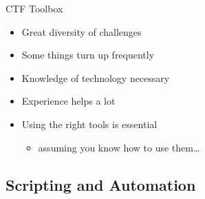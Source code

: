\begin{frame}
  {CTF Toolbox}

  \begin{itemize}
    \item Great diversity of challenges
    \item Some things turn up frequently
    \item Knowledge of technology necessary
    \item Experience helps a lot
  \end{itemize}

  \begin{itemize}
    \item Using the right tools is essential
      \begin{itemize}
        \item assuming you know how to use them\ldots
      \end{itemize}
  \end{itemize}

\end{frame}





\subsection{Scripting and Automation}


